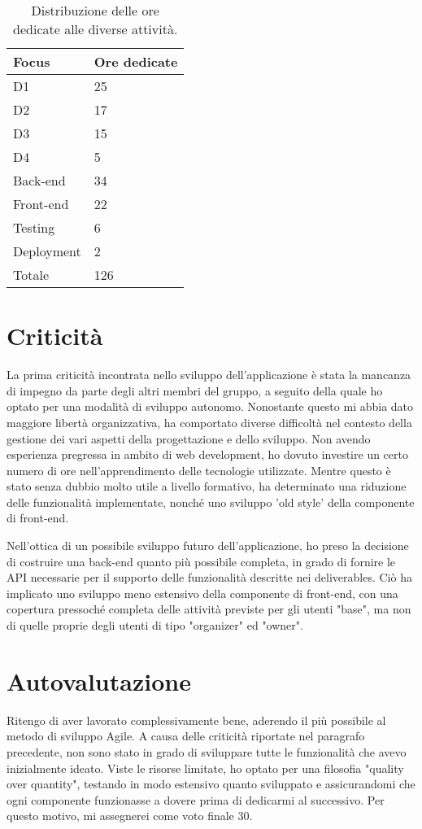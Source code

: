 \documentclass[9pt]{extarticle}
\begin{document}
\begin{table}[htb!]
	\centering
	\begin{tabular}{ll}
		Focus     & Ore dedicate \\\toprule
		D1        & 25            \\
		D2        & 17            \\
		D3        & 15            \\
		D4        & 5             \\
		Back-end  & 34            \\
		Front-end & 22            \\
		Testing   & 6             \\
		Deployment & 2            \\\midrule
		Totale    & 126           \\\bottomrule
	\end{tabular}
	\caption{Distribuzione delle ore dedicate alle diverse attività.}
	\label{table:ore}
\end{table}

\section{Criticità}

La prima criticità incontrata nello sviluppo dell'applicazione è stata
la mancanza di impegno da parte degli altri membri del gruppo, a
seguito della quale ho optato per una modalità di sviluppo autonomo.
Nonostante questo mi abbia dato maggiore libertà organizzativa, ha comportato
diverse difficoltà nel contesto della gestione dei vari aspetti della
progettazione e dello sviluppo. Non avendo esperienza pregressa in ambito di
web development, ho dovuto investire un certo numero di ore nell'apprendimento
delle tecnologie utilizzate. Mentre questo è stato senza dubbio molto utile
a livello formativo, ha determinato una riduzione delle funzionalità
implementate, nonché uno sviluppo 'old style' della componente di front-end.

Nell'ottica di un possibile sviluppo futuro dell'applicazione, ho preso la decisione di costruire una back-end quanto più possibile completa, in grado di fornire le API necessarie per il supporto delle funzionalità descritte nei deliverables. Ciò ha implicato uno sviluppo meno estensivo della componente di front-end, con una copertura pressoché completa delle attività previste per gli utenti "base", ma non di quelle proprie degli utenti di tipo "organizer" ed "owner".


\section{Autovalutazione}

Ritengo di aver lavorato complessivamente bene, aderendo il più possibile al metodo di sviluppo Agile. A causa delle criticità riportate nel paragrafo precedente, non sono stato in grado di sviluppare tutte le funzionalità che avevo inizialmente ideato. Viste le risorse limitate, ho optato per una filosofia "quality over quantity", testando in modo estensivo quanto sviluppato e assicurandomi che ogni componente funzionasse a dovere prima di dedicarmi al successivo. Per questo motivo, mi assegnerei come voto finale 30.
\end{document}
